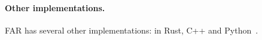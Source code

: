 \paragraph{Other implementations.} FAR has several other implementations: in Rust, C++ and Python~\cite{FAR,FAR_Tony,FAR_cosmo}.








